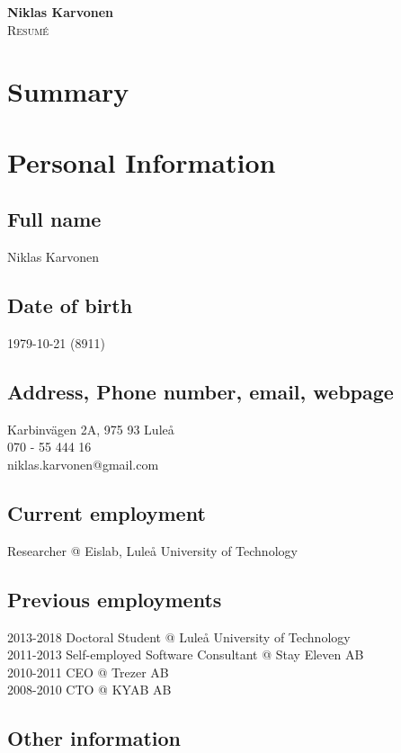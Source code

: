 \documentclass{article}
\makeatletter
\newlength\drop
\newcommand*\titleM{\begingroup%
\setlength\drop{0.08\textheight}
\centering
\vspace*{\drop}
{\Huge\bfseries Niklas Karvonen}\\[\baselineskip]
{\scshape Resumé}\\[\baselineskip]
\vfill
{\large\scshape }\par
\vfill
{\scshape \@date}\par
\vspace*{2\drop}
\endgroup}
\makeatother
\begin{document}
\begin{titlingpage}
\titleM
\end{titlingpage}
\newpage

\tableofcontents
\newpage

\section{Summary}


\section{Personal Information}


\subsection{Full name} Niklas Karvonen  \\
\subsection{Date of birth} 1979-10-21 (8911) \\
\subsection{Address, Phone number, email, webpage}
Karbinvägen 2A, 975 93 Luleå \\
070 - 55 444 16 \\ 
niklas.karvonen@gmail.com \\

\subsection{Current employment} Researcher @ Eislab, Luleå University of Technology \\
\subsection{Previous employments}
2013-2018 Doctoral Student @ Luleå University of Technology \\
2011-2013 Self-employed Software Consultant @ Stay Eleven AB \\
2010-2011 CEO @ Trezer AB \\
2008-2010 CTO @ KYAB AB \\

\subsection{Other information}
\end{document}
